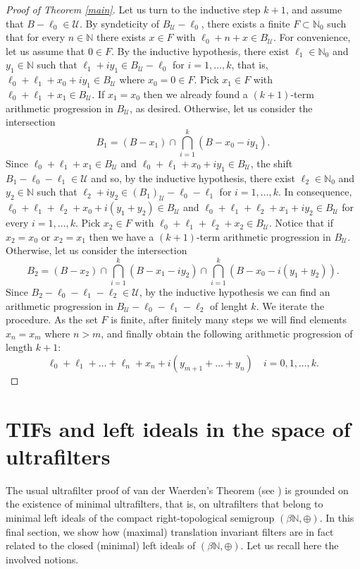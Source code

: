 \documentclass[10pt]{amsart}
\theoremstyle{definition}
\theoremstyle{remark}
\def\N{\mathbb{N}}
\def\U{\mathcal{U}}
\begin{document}
\begin{proof}[Proof of Theorem \ref{main}]
Let us turn to the inductive step $k+1$, and assume that $B-\ell_0\in\U$.
By syndeticity of $B_\U-\ell_0$, there exists a finite $F\subset\N_0$ such that
for every $n\in\N$ there exists $x\in F$ with $\ell_0+n+x\in B_\U$.
For convenience, let us assume that $0\in F$.
By the inductive hypothesis, there exist $\ell_1\in\N_0$ and 
$y_1\in\N$ such that $\ell_1+i y_1\in B_\U-\ell_0$ for $i=1,\ldots,k$, that is,
$\ell_0+\ell_1+x_0+i y_1\in B_\U$ where $x_0=0\in F$.
Pick $x_1\in F$ with $\ell_0+\ell_1+x_1\in B_\U$.
If $x_1=x_0$ then we already
found a $(k+1)$-term arithmetic progression in $B_\U$,
as desired. Otherwise, let us consider the intersection
$$B_1=(B-x_1)\cap\bigcap_{i=1}^k(B-x_0-i y_1).$$
Since $\ell_0+\ell_1+x_1\in B_\U$ and
$\ell_0+\ell_1+x_0+i y_1\in B_\U$, the shift $B_1-\ell_0-\ell_1\in\U$
and so, by the inductive hypothesis, there exist $\ell_2\in\N_0$
and $y_2\in\N$ such that $\ell_2+i y_2\in (B_1)_\U-\ell_0-\ell_1$ for $i=1,\ldots,k$.
In consequence, $\ell_0+\ell_1+\ell_2+x_0+i(y_1+y_2)\in B_\U$
and $\ell_0+\ell_1+\ell_2+x_1+i y_2\in B_\U$ for every $i=1,\ldots,k$.
Pick $x_2\in F$ with $\ell_0+\ell_1+\ell_2+x_2\in B_\U$.
Notice that if $x_2=x_0$ or $x_2=x_1$ then we have
a $(k+1)$-term arithmetic progression in $B_\U$. Otherwise, let
us consider the intersection
$$B_2=(B-x_2)\cap\bigcap_{i=1}^k(B-x_1-iy_2)\cap
\bigcap_{i=1}^k(B-x_0-i(y_1+y_2)).$$
Since $B_2-\ell_0-\ell_1-\ell_2\in\U$, by the inductive hypothesis
we can find an arithmetic progression in $B_\U-\ell_0-\ell_1-\ell_2$
of lenght $k$. We iterate the procedure.
As the set $F$ is finite,
after finitely many steps we will find elements $x_n=x_m$ where $n>m$,
and finally obtain the following arithmetic progression of length $k+1$:
$$\ell_0+\ell_1+\ldots+\ell_n+x_n+i(y_{m+1}+\ldots+y_n)\quad
i=0,1,\ldots,k.$$
\end{proof}

\section{TIFs and left ideals in the space of ultrafilters}

The usual ultrafilter proof of van der Waerden's Theorem
(see \cite[\S 14.1]{hs})
is grounded on the existence of minimal ultrafilters, that is, 
on ultrafilters that belong to minimal left ideals of the
compact right-topological semigroup $(\beta\N,\oplus)$.
In this final section, we show how
(maximal) translation invariant filters are in fact related
to the closed (minimal) left ideals of $(\beta\N,\oplus)$. 
Let us recall here the involved notions.
\end{document}
